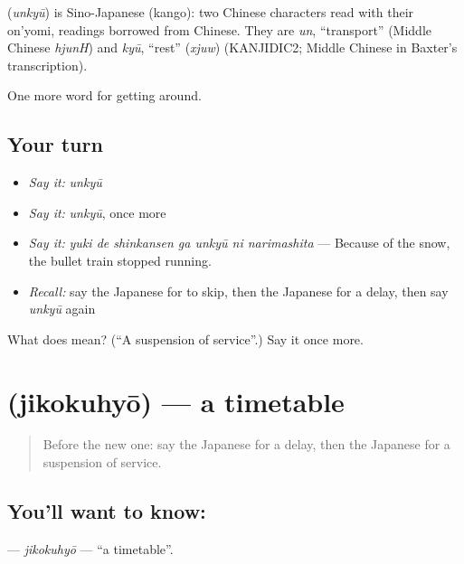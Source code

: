 \begin{cousinweb}
\textbf{} (\emph{unkyū}) is Sino-Japanese (kango): two Chinese characters read with their on'yomi, readings borrowed from Chinese. They are \emph{un}, \textquotedblleft{}transport\textquotedblright{} (Middle Chinese \emph{hjunH}) and \emph{kyū}, \textquotedblleft{}rest\textquotedblright{} (\emph{xjuw}) (KANJIDIC2; Middle Chinese in Baxter's transcription).
\end{cousinweb}

\begin{grammarlens}[title={What you've built}]
One more word for getting around.
\end{grammarlens}

\subsection*{Your turn}
\begin{itemize}
\raggedright
  \item \emph{Say it:} \emph{unkyū}
  \item \emph{Say it:} \emph{unkyū}, once more
  \item \emph{Say it:} \emph{yuki de shinkansen ga unkyū ni narimashita} — Because of the snow, the bullet train stopped running.
  \item \emph{Recall:} say the Japanese for to skip, then the Japanese for a delay, then say \emph{unkyū} again
\end{itemize}

\begin{tcolorbox}[breakable,colback=teal!4,colframe=teal!35!black,title={Before you move on}]
What does  mean? (\textquotedblleft{}A suspension of service\textquotedblright{}.) Say it once more.
\end{tcolorbox}
\section[\texorpdfstring{\ja{じこくひょう} (jikokuhyō)}{じこくひょう (jikokuhyō)}]{ (jikokuhyō) — a timetable}

\label{lesson:JA-C377-jikokuhyou}



\begin{quote}
Before the new one: say the Japanese for a delay, then the Japanese for a suspension of service.
\end{quote}

\subsection*{You'll want to know: }
\textbf{} — \emph{jikokuhyō} — \textquotedblleft{}a timetable\textquotedblright{}.

